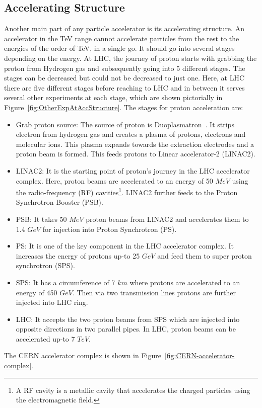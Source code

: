 \subsection{Accelerating Structure} %
\label{sub:accelerating_structure}

Another main part of any particle accelerator is its accelerating structure. An accelerator in the TeV range cannot accelerate particles from the rest to the energies of the order of TeV, in a single go.  It should go into several stages depending on the energy. At LHC, the journey of proton starts with grabbing the proton from Hydrogen gas and subsequently going into 5 different stages. The stages can be decreased but could not be decreased to just one. Here, at LHC there are five different stages before reaching to LHC and in between it serves several other experiments at each stage, which are shown pictorially in Figure~\ref{fig:OtherExpAtAccStructure}. The stages for proton acceleration are:
\begin{itemize}
    \item Grab proton source: The source of proton is Duoplasmatron~\cite{LHC-tdr-vol3}. It strips electron from hydrogen gas and creates a plasma of protons, electrons and molecular ions. This plasma expands towards the extraction electrodes and a proton beam is formed. This feeds protons to Linear accelerator-2 (LINAC2).
    \item LINAC2: It is the starting point of proton's journey in the LHC accelerator complex. Here, proton beams are accelerated to an energy of 50 $MeV$ using the radio-frequency (RF) cavities\footnote{A RF cavity is a metallic cavity that accelerates the charged particles using the electromagnetic field.}. LINAC2 further feeds to the Proton Synchrotron Booster (PSB).
    \item PSB: It takes 50 $MeV$ proton beams from LINAC2 and accelerates them to 1.4 $GeV$ for injection into Proton Synchrotron (PS).
    \item PS: It is one of the key component in the LHC accelerator complex. It increases the energy of protons up-to 25 $GeV$ and feed them to super proton synchrotron (SPS).
    \item SPS: It has a circumference of 7 $km$ where protons are accelerated to an energy of 450 $GeV$. Then via two transmission lines protons are further injected into LHC ring.
    \item LHC: It accepts the two proton beams from SPS which are injected into opposite directions in two parallel pipes. In LHC, proton beams can be accelerated up-to 7 $TeV$.
\end{itemize}
The CERN accelerator complex is shown in Figure~\ref{fig:CERN-accelerator-complex}.  

